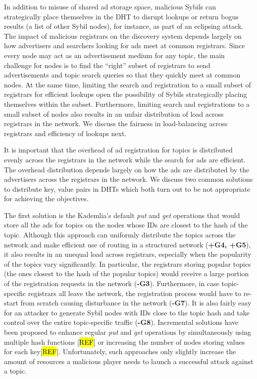 In addition to misuse of shared ad storage space, malicious Sybils can strategically place themselves in the DHT to disrupt lookups or return bogus results (\ie a list of other Sybil nodes), for instance, as part of an eclipsing attack. The impact of malicious registrars on the discovery system depends largely on how advertisers and searchers looking for ads meet at common registrars. Since every node may act as an advertisement medium for any topic, the main challenge for nodes is to find the ``right'' subset of registrars to send advertisements and topic search queries so that they quickly meet at common nodes. At the same time, limiting the search and registration to a small subset of registrars for efficient lookups open the possibility of Sybils strategically placing themselves within the subset. Furthermore, limiting search and registrations to a small subset of nodes also results in an unfair distribution of load across registrars in the network. We discuss the fairness in load-balancing across registrars and efficiency of lookups next.

 It is important that the overhead of ad registration for topics is distributed evenly across the registrars in the network while the search for ads are efficient. The overhead distribution depends largely on how the ads are distributed by the advertisers across the registrars in the network. We discuss two common solutions to distribute key, value pairs in DHTs which both turn out to be not appropriate for achieving the objectives. 

The first solution is the Kademlia's default \emph{put} and \emph{get} operations that would store all the ads for topics  on the nodes whose IDs are closest to the hash of the topic. Although this approach can uniformly distribute the topics across the network and make efficient use of routing in a structured network (\textbf{+G4, +G5}), it also results in an unequal load across registrars, especially when the popularity of the topics vary significantly. In particular, the registrars storing popular topics (\ie the ones closest to the hash of the popular topics) would receive a large portion of the registration requests in the network (\textbf{-G3}). Furthermore, in case topic-specific registrars all leave the network, the registration process would have to re-start from scratch causing disturbance in the network (\textbf{-G7}). It is also fairly easy for an attacker to generate Sybil nodes with IDs close to the topic hash and take control over the entire topic-specific traffic (\textbf{-G8}). Incremental solutions have been  proposed to enhance regular \emph{put} and \emph{get} operations by simultaneously using multiple hash functions [\hl{REF}] or increasing the number of nodes storing values for each key[\hl{REF}]. 
Unfortunately, such approaches only slightly increase the amount of resources a malicious player needs to launch a successful attack against a topic. 

